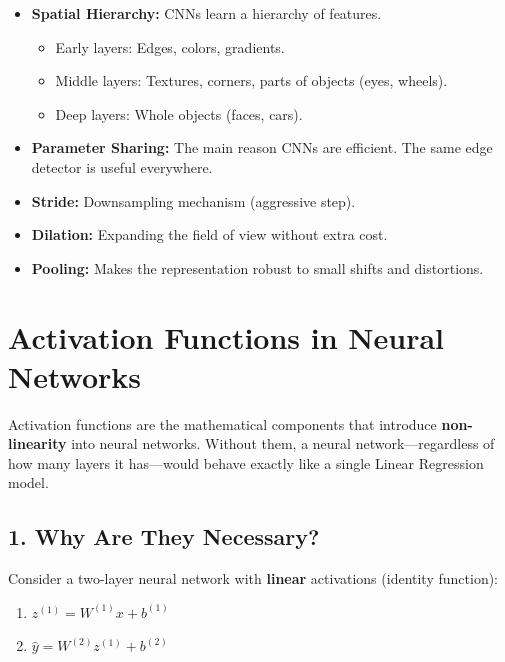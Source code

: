 \documentclass[
  italian,
  11pt,
]{article}
\begin{document}
\begin{itemize}
\item
  \textbf{Spatial Hierarchy:} CNNs learn a hierarchy of features.

  \begin{itemize}
  \item
    Early layers: Edges, colors, gradients.
  \item
    Middle layers: Textures, corners, parts of objects (eyes, wheels).
  \item
    Deep layers: Whole objects (faces, cars).
  \end{itemize}
\item
  \textbf{Parameter Sharing:} The main reason CNNs are efficient. The
  same edge detector is useful everywhere.
\item
  \textbf{Stride:} Downsampling mechanism (aggressive step).
\item
  \textbf{Dilation:} Expanding the field of view without extra cost.
\item
  \textbf{Pooling:} Makes the representation robust to small shifts and
  distortions.

  \newpage
\end{itemize}

\section{Activation Functions in Neural
Networks}\label{activation-functions-in-neural-networks}

Activation functions are the mathematical components that introduce
\textbf{non-linearity} into neural networks. Without them, a neural
network---regardless of how many layers it has---would behave exactly
like a single Linear Regression model.

\subsection{1. Why Are They Necessary?}\label{why-are-they-necessary}

Consider a two-layer neural network with \textbf{linear} activations
(identity function):

\begin{enumerate}
\def\labelenumi{\arabic{enumi}.}
\item
  \(z^{(1)} = W^{(1)} x + b^{(1)}\)
\item
  \(\hat{y} = W^{(2)} z^{(1)} + b^{(2)}\)
\end{enumerate}
\end{document}
